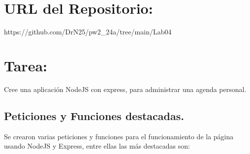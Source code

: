 \documentclass{article}
\begin{document}
\section{URL del Repositorio:}
https://github.com/DrN25/pw2\_24a/tree/main/Lab04
	
\section{Tarea:}
Cree una aplicación NodeJS con express, para administrar una agenda personal.
\subsection*{Peticiones y Funciones destacadas.}
Se crearon varias peticiones y funciones para el funcionamiento de la página usando NodeJS y Express, entre ellas las más destacadas son:
\end{document}
